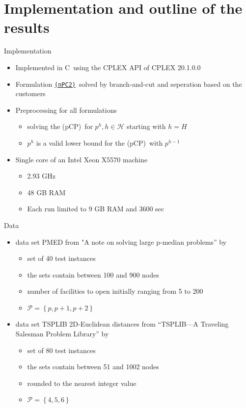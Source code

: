 \documentclass[utf8,aspectratio=169,ngerman,english]{beamer}
\renewcommand{\emph}[1]{\textcolor{jkuGreen}{#1}}
\newcommand{\nPCY}{\hyperref[eq:nPCY]{\texttt{(nPC2)}}}
\newcommand{\pCP}{\emph{(pCP)}}
\def\Cplusplus{C\raisebox{0.5ex}{\tiny\textbf{++}}}
\begin{document}
\section{Implementation and outline of the results}
\begin{frame}{Implementation}
    \begin{itemize}
        \item Implemented in \Cplusplus\ using the CPLEX API of CPLEX 20.1.0.0
        \item Formulation \nPCY\ solved by branch-and-cut and seperation based on the customers
        \item Preprocessing for all formulations
        \begin{itemize}
            \item solving the \pCP\ for $p^h, h \in \mathcal H$ starting with $h = H$
            \item $p^h$ is a valid lower bound for the \pCP\ with $p^{h-1}$
        \end{itemize}
        \item Single core of an Intel Xeon X5570 machine
        \begin{itemize}
            \item 2.93 GHz
            \item 48 GB RAM
            \item Each run limited to 9 GB RAM and 3600 sec
        \end{itemize}
    \end{itemize}
\end{frame}
\begin{frame}{Data}
    \vspace*{-2pt}
    \begin{itemize}
    \setlength\itemsep{1em}
        \item data set \emph{PMED} from "A note on solving large p-median problems” by \textcite{Beasley1985}
        \begin{itemize}
            \item set of 40 test instances
            \item the sets contain between 100 and 900 nodes
            \item number of facilities to open initially ranging from 5 to 200
            \item $\mathcal P = \left \{p, p+1, p+2\right \}$
        \end{itemize} \pause
        \item data set \emph{TSPLIB} 2D-Euclidean distances from “TSPLIB—A Traveling Salesman Problem Library” by \textcite{Reinelt1991}
        \begin{itemize}
            \item set of 80 test instances
            \item the sets contain between 51 and 1002 nodes
            \item rounded to the nearest integer value
            \item $\mathcal P = \left \{4, 5, 6\right \}$
        \end{itemize}
    \end{itemize}
\end{frame}
\end{document}
